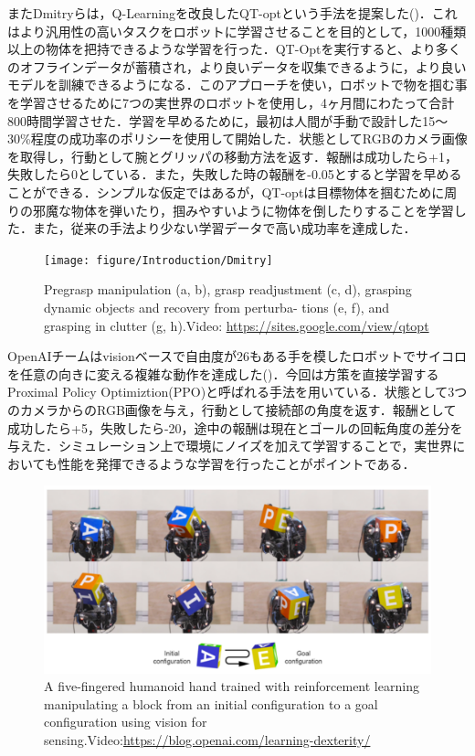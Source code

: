 またDmitryらは，Q-Learningを改良したQT-optという手法を提案した\cite{Dmitry2018}()．これはより汎用性の高いタスクをロボットに学習させることを目的として，1000種類以上の物体を把持できるような学習を行った．QT-Optを実行すると、より多くのオフラインデータが蓄積され，より良いデータを収集できるように，より良いモデルを訓練できるようになる．このアプローチを使い，ロボットで物を掴む事を学習させるために7つの実世界のロボットを使用し，4ヶ月間にわたって合計800時間学習させた．学習を早めるために，最初は人間が手動で設計した15～30\%程度の成功率のポリシーを使用して開始した．状態としてRGBのカメラ画像を取得し，行動として腕とグリッパの移動方法を返す．報酬は成功したら+1，失敗したら0としている．また，失敗した時の報酬を-0.05とすると学習を早めることができる．シンプルな仮定ではあるが，QT-optは目標物体を掴むために周りの邪魔な物体を弾いたり，掴みやすいように物体を倒したりすることを学習した．また，従来の手法より少ない学習データで高い成功率を達成した．

\begin{figure}
    \centering
    \texttt{[image: figure/Introduction/Dmitry]}
    \caption{Pregrasp manipulation (a, b), grasp readjustment (c, d), grasping dynamic objects and recovery from perturba- tions (e, f), and grasping in clutter (g, h)\cite{Dmitry2018}.Video: \url{https://sites.google.com/view/qtopt}}
    \label{fig:Dmitry}
\end{figure}


OpenAIチームはvisionベースで自由度が26もある手を模したロボットでサイコロを任意の向きに変える複雑な動作を達成した\cite{OpenAI2018}()．今回は方策を直接学習するProximal Policy Optimiztion(PPO)と呼ばれる手法を用いている．状態として3つのカメラからのRGB画像を与え，行動として接続部の角度を返す．報酬として成功したら+5，失敗したら-20，途中の報酬は現在とゴールの回転角度の差分を与えた．シミュレーション上で環境にノイズを加えて学習することで，実世界においても性能を発揮できるような学習を行ったことがポイントである．
\begin{figure}
    \centering
    \includegraphics[width=\linewidth]{figure/Introduction/openAI_cube}
    \caption{A five-fingered humanoid hand trained with reinforcement learning manipulating a block from an initial configuration to a goal configuration using vision for sensing\cite{OpenAI2018}.Video:\url{https://blog.openai.com/learning-dexterity/}}
    \label{fig:OpenAI}
\end{figure}

